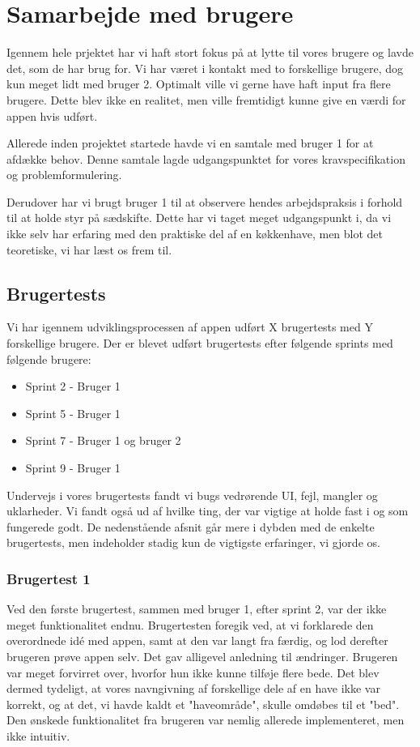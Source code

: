 \section{Samarbejde med brugere}
Igennem hele prjektet har vi haft stort fokus på at lytte til vores brugere og lavde det, som de har brug for. Vi har været i kontakt med to forskellige brugere, dog kun meget lidt med bruger 2. Optimalt ville vi gerne have haft input fra flere brugere. Dette blev ikke en realitet, men ville fremtidigt kunne give en værdi for appen hvis udført.

Allerede inden projektet startede havde vi en samtale med bruger 1 for at afdække behov. Denne samtale lagde udgangspunktet for vores kravspecifikation og problemformulering.

Derudover har vi brugt bruger 1 til at observere hendes arbejdspraksis i forhold til at holde styr på sædskifte. Dette har vi taget meget udgangspunkt i, da vi ikke selv har erfaring med den praktiske del af en køkkenhave, men blot det teoretiske, vi har læst os frem til.

\subsection{Brugertests}
Vi har igennem udviklingsprocessen af appen udført X brugertests med Y forskellige brugere. Der er blevet udført brugertests efter følgende sprints med følgende brugere:
\begin{itemize}
    \item Sprint 2 - Bruger 1
    \item Sprint 5 - Bruger 1
    \item Sprint 7 - Bruger 1 og bruger 2
    \item Sprint 9 - Bruger 1
\end{itemize}

Undervejs i vores brugertests fandt vi bugs vedrørende UI, fejl, mangler og uklarheder. Vi fandt også ud af hvilke ting, der var vigtige at holde fast i og som fungerede godt. De nedenstående afsnit går mere i dybden med de enkelte brugertests, men indeholder stadig kun de vigtigste erfaringer, vi gjorde os.

\subsubsection{Brugertest 1}
Ved den første brugertest, sammen med bruger 1, efter sprint 2, var der ikke meget funktionalitet endnu. Brugertesten foregik ved, at vi forklarede den overordnede idé med appen, samt at den var langt fra færdig, og lod derefter brugeren prøve appen selv. Det gav alligevel anledning til ændringer. Brugeren var meget forvirret over, hvorfor hun ikke kunne tilføje flere bede. Det blev dermed tydeligt, at vores navngivning af forskellige dele af en have ikke var korrekt, og at det, vi havde kaldt et "haveområde", skulle omdøbes til et "bed". Den ønskede funktionalitet fra brugeren var nemlig allerede implementeret, men ikke intuitiv.

